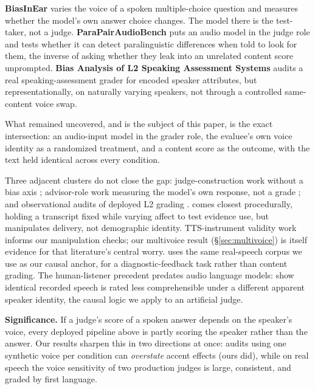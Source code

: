 \textbf{BiasInEar} \citep{wei2026biasintheear} varies the voice of a spoken
multiple-choice question and measures whether the model's own answer choice
changes. The model there is the test-taker, not a judge.
\textbf{ParaPairAudioBench} \citep{jeon2026parapairaudi} puts an audio
model in the judge role and tests whether it can detect paralinguistic
differences when told to look for them, the inverse of asking whether they
leak into an unrelated content score unprompted.
\textbf{Bias Analysis of L2 Speaking Assessment Systems}
\citep{labroo2026biasanalysis} audits a real speaking-assessment grader for
encoded speaker attributes, but representationally, on naturally varying
speakers, not through a controlled same-content voice swap.

What remained uncovered, and is the subject of this paper, is the exact
intersection: an audio-input model in the grader role, the evaluee's own
voice identity as a randomized treatment, and a content score as the
outcome, with the text held identical across every condition.

Three adjacent clusters do not close the gap: judge-construction work
without a bias axis \citep{wang2025speechllmasj,zhang2026jastinaligni,
chen2025audiolargela,park2026auditingprot,chiang2025audioawarela,
liu2025vocalbenchdf,takagi2026investigatin}; advisor-role work measuring
the model's own response, not a grade \citep{wu2025evaluatingbi,
lin2026vibevoiceind,satish2025speakyourmin,satish2025dobiasbenchm,
choi2025acousticbase}; and observational audits of deployed L2 grading
\citep{uehara2026interpretabl,ginjala2026doLLMdecoders,koenecke2020racial}.
\citet{miller2026doaudiolangu} comes closest procedurally, holding a
transcript fixed while varying affect to test evidence use, but manipulates
delivery, not demographic identity. TTS-instrument validity work
\citep{zhong2025pairwiseeval,huang2026codecmosacce,xinyuan2025scalablecont,
yang2025positiontowa,ren2026mosbiasfromh} informs our manipulation checks;
our multivoice result (\S\ref{sec:multivoice}) is itself evidence for that
literature's central worry. \citet{wang2026priorongevidence} uses the same
real-speech corpus we use as our causal anchor, for a diagnostic-feedback
task rather than content grading. The human-listener precedent predates
audio language models: \citet{kang2009reverse} show identical recorded
speech is rated less comprehensible under a different apparent speaker
identity, the causal logic we apply to an artificial judge.

\textbf{Significance.} If a judge's score of a spoken answer depends on the
speaker's voice, every deployed pipeline above is partly scoring the speaker
rather than the answer. Our results sharpen this in two directions at once:
audits using one synthetic voice per condition can \emph{overstate} accent
effects (ours did), while on real speech the voice sensitivity of two
production judges is large, consistent, and graded by first language.

